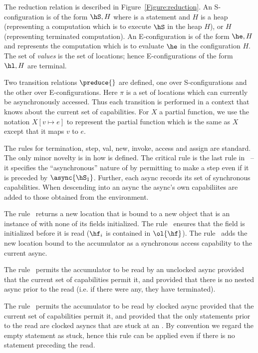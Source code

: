 The reduction relation is described in
Figure~\ref{Figure:reduction}. An S-configuration is of the form
$\hS,H$ where \hS{} is a statement and $H$ is a heap (representing a
computation which is to execute $\hS$ in the heap $H$), or $H$
(representing terminated computation). An
E-configuration is of the form $\he,H$ and represents the
computation which is to evaluate $\he$ in the configuration $H$. The
set of {\em values} is the set of locations; hence E-configurations of
the form $\hl,H$ are terminal.

Two transition relations $\preduce{}$ are defined, one over
S-configurations and the other over E-configurations. Here $\pi$ is a
set of locations which can currently be asynchronously accessed.  Thus
each transition is performed in a context that knows about the current
set of capabilities.  For $X$ a partial function, we use the notation
$X[v \mapsto e]$ to represent the partial function which is the same
as $X$ except that it maps $v$ to $e$.

The rules for termination, step, val, new, invoke, access and assign
are standard.  The only minor novelty is in how \hasync{} is
defined. The critical rule is the last rule in~ -- it
specifies the ``asynchronous'' nature of \hasync{} by permitting \hS{}
to make a step even if it is preceded by $\async{\hS_1}$. Further,
each async records its set of synchronous capabilities. When
descending into an async the async's own capabiliites are added to
those obtained from the environment.

%
The rule~ returns a new location that is bound to a new
object that is an instance of \hC{} with none of its fields initialized.
%
The rule~ ensures that the field is initialized before it is
read ($\hf_i$ is contained in $\ol{\hf}$).
%
The rule~ adds the new location bound to the
accumulator as a synchronous access capability to the current async.
%

The rule~ permits the accumulator to be read by an
unclocked async provided that the current set of capabilities permit
it, and provided that there is no nested async prior to the read
(i.e.{} if there were any, they have terminated).

The rule~ permits the accumulator to be read by 
clocked async provided that the current set of capabilities permit
it, and provided that the only statements prior to the read are
clocked asyncs that are stuck at an \hadvance. By convention we regard
the empty statement as stuck, hence this rule can be applied even if
there is no statement preceding the read. 

